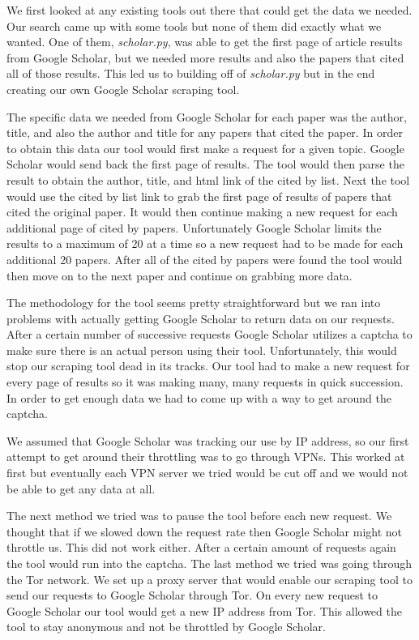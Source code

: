 \documentclass[letterpaper]{article}
\begin{document}
We first looked at any existing tools out there that could get the data we needed.
Our search came up with some tools but none of them did exactly what we wanted.
One of them, \emph{scholar.py}, was able to get the first page of article results from Google Scholar, but we needed more results and also the papers that cited all of those results.
This led us to building off of \emph{scholar.py} but in the end creating our own Google Scholar scraping tool.

The specific data we needed from Google Scholar for each paper was the author, title, and also the author and title for any papers that cited the paper.
In order to obtain this data our tool would first make a request for a given topic.
Google Scholar would send back the first page of results.
The tool would then parse the result to obtain the author, title, and html link of the cited by list.
Next the tool would use the cited by list link to grab the first page of results of papers that cited the original paper.
It would then continue making a new request for each additional page of cited by papers. Unfortunately Google Scholar limits the results to a maximum of 20 at a time so a new request had to be made for each additional 20 papers.
After all of the cited by papers were found the tool would then move on to the next paper and continue on grabbing more data.

The methodology for the tool seems pretty straightforward but we ran into problems with actually getting Google Scholar to return data on our requests.
After a certain number of successive requests Google Scholar utilizes a captcha to make sure there is an actual person using their tool.
Unfortunately, this would stop our scraping tool dead in its tracks.
Our tool had to make a new request for every page of results so it was making many, many requests in quick succession.
In order to get enough data we had to come up with a way to get around the captcha.

We assumed that Google Scholar was tracking our use by IP address, so our first attempt to get around their throttling was to go through VPNs.
This worked at first but eventually each VPN server we tried would be cut off and we would not be able to get any data at all.

The next method we tried was to pause the tool before each new request.
We thought that if we slowed down the request rate then Google Scholar might not throttle us.
This did not work either. After a certain amount of requests again the tool would run into the captcha.
The last method we tried was going through the Tor network.
We set up a proxy server that would enable our scraping tool to send our requests to Google Scholar through Tor.
On every new request to Google Scholar our tool would get a new IP address from Tor.
This allowed the tool to stay anonymous and not be throttled by Google Scholar.
\end{document}
